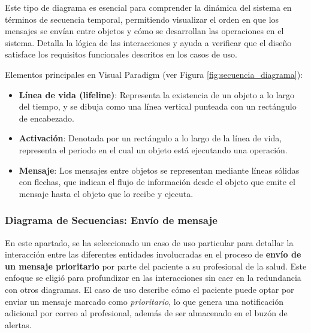 \documentclass{article}
\begin{document}
Este tipo de diagrama es esencial para comprender la dinámica del sistema en términos de secuencia temporal, permitiendo visualizar el orden en que los mensajes se envían entre objetos y cómo se desarrollan las operaciones en el sistema. Detalla la lógica de las interacciones y ayuda a verificar que el diseño satisface los requisitos funcionales descritos en los casos de uso.

Elementos principales en Visual Paradigm (ver Figura \ref{fig:secuencia_diagrama}):
\begin{itemize}
	\item \textbf{Línea de vida (lifeline)}: Representa la existencia de un objeto a lo largo del tiempo, y se dibuja como una línea vertical punteada con un rectángulo de encabezado.
	\item \textbf{Activación}: Denotada por un rectángulo a lo largo de la línea de vida, representa el periodo en el cual un objeto está ejecutando una operación.
	\item \textbf{Mensaje}: Los mensajes entre objetos se representan mediante líneas sólidas con flechas, que indican el flujo de información desde el objeto que emite el mensaje hasta el objeto que lo recibe y ejecuta.
\end{itemize}


\subsubsection{Diagrama de Secuencias: Envío de mensaje}

En este apartado, se ha seleccionado un caso de uso particular para detallar la interacción entre las diferentes entidades involucradas en el proceso de \textbf{envío de un mensaje prioritario} por parte del paciente a su profesional de la salud. Este enfoque se eligió para profundizar en las interacciones sin caer en la redundancia con otros diagramas. El caso de uso describe cómo el paciente puede optar por enviar un mensaje marcado como \textit{prioritario}, lo que genera una notificación adicional por correo al profesional, además de ser almacenado en el buzón de alertas.
\end{document}
